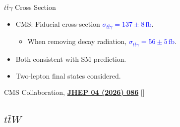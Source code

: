 \documentclass{beamer}
\begin{document}
\begin{frame}{$t\bar{t}\gamma$ Cross Section}
  \begin{itemize}
    \item CMS: Fiducial cross-section \textcolor{blue}{$\sigma_{t\bar{t}\gamma} = 137 \pm 8\,\unit{\femto\barn}$}.
    \begin{itemize}
      \item When removing decay radiation, \textcolor{blue}{$\sigma_{t\bar{t}\gamma} = 56 \pm 5\,\unit{\femto\barn}$}.
    \end{itemize} 
    \item Both consistent with SM prediction.
    \item Two-lepton final states considered.
  \end{itemize}
  {\tiny \color{gray} CMS Collaboration, \textbf{\href{https://doi.org/10.1007/JHEP04(2026)086}{JHEP 04 (2026) 086}} [\href{https://arxiv.org/abs/2511.01995v2}{}]}
\end{frame}

\subsection{$t\bar{t}W$}
\end{document}
